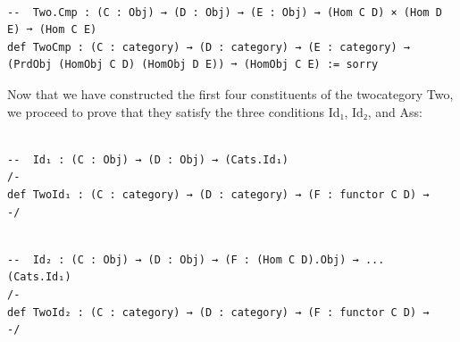 \documentclass{book}
\newcounter{lcounter}
\begin{document}
\begin{center}
\begin{tcolorbox}[width=5in,colback={white},title={\begin{center}\texttt{Lean \thelcounter} \addtocounter{lcounter}{1}  \end{center}},colbacktitle=Blue,coltitle=black]
\begin{verbatim}

--  Two.Cmp : (C : Obj) → (D : Obj) → (E : Obj) → (Hom C D) × (Hom D E) ➞ (Hom C E)    
def TwoCmp : (C : category) → (D : category) → (E : category) → (PrdObj (HomObj C D) (HomObj D E)) ➞ (HomObj C E) := sorry

\end{verbatim}%
\end{tcolorbox}
\end{center}

Now that we have constructed the first four constituents of the twocategory Two, we proceed to prove that they satisfy the three conditions Id₁, Id₂, and Ass:\\

\begin{center}
\begin{tcolorbox}[width=5in,colback={white},title={\begin{center}\texttt{Lean \thelcounter} \addtocounter{lcounter}{1}  \end{center}},colbacktitle=Blue,coltitle=black]
\begin{verbatim}

--  Id₁ : (C : Obj) → (D : Obj) → (Cats.Id₁)
/-
def TwoId₁ : (C : category) → (D : category) → (F : functor C D) → 
-/

\end{verbatim}%
\end{tcolorbox}
\end{center}


\begin{center}
\begin{tcolorbox}[width=5in,colback={white},title={\begin{center}\texttt{Lean \thelcounter} \addtocounter{lcounter}{1}  \end{center}},colbacktitle=Blue,coltitle=black]
\begin{verbatim}

--  Id₂ : (C : Obj) → (D : Obj) → (F : (Hom C D).Obj) → ...      (Cats.Id₁)
/-
def TwoId₂ : (C : category) → (D : category) → (F : functor C D) → 
-/

\end{verbatim}%
\end{tcolorbox}
\end{center}
\end{document}
